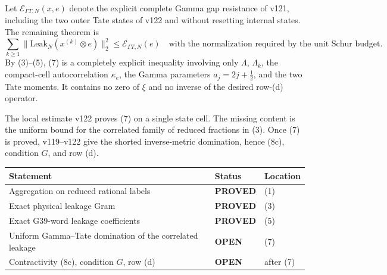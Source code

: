\documentclass[11pt]{article}
\newcommand{\PROVED}{\textcolor{green!40!black}{\textbf{PROVED}}}
\newcommand{\OPEN}{\textcolor{red!70!black}{\textbf{OPEN}}}
\begin{document}
Let $\mathcal E_{\Gamma T,N}(x,e)$ denote the explicit complete Gamma gap
resistance of v121, including the two outer Tate states of v122 and without
resetting internal states.  The remaining theorem is
\begin{equation}
 \boxed{
 \sum_{k\ge1}
 \|\mathrm{Leak}_N(x^{(k)}\otimes e)\|_2^2
 \le \mathcal E_{\Gamma T,N}(e)
 \quad\text{with the normalization required by the unit Schur budget}.}
                                                                    \tag{7}
\end{equation}
By (3)--(5), (7) is a completely explicit inequality involving only
$\Lambda$, $\Lambda_k$, the compact-cell autocorrelation $\kappa_e$, the
Gamma parameters $a_j=2j+\frac12$, and the two Tate moments.  It contains
no zero of $\xi$ and no inverse of the desired row-(d) operator.

The local estimate v122 proves (7) on a single state cell.  The missing
content is the uniform bound for the correlated family of reduced fractions
in (3).  Once (7) is proved, v119--v122 give the shorted inverse-metric
domination, hence (8c), condition $G$, and row (d).

\begin{center}
\begin{tabular}{>{\raggedright\arraybackslash}p{.55\linewidth}
                >{\centering\arraybackslash}p{.15\linewidth}
                >{\raggedright\arraybackslash}p{.20\linewidth}}
\toprule
Statement & Status & Location \\
\midrule
Aggregation on reduced rational labels & \PROVED & (1) \\
Exact physical leakage Gram & \PROVED & (3) \\
Exact G39-word leakage coefficients & \PROVED & (5) \\
Uniform Gamma--Tate domination of the correlated leakage & \OPEN & (7) \\
Contractivity (8c), condition $G$, row (d) & \OPEN & after (7) \\
\bottomrule
\end{tabular}
\end{center}
\end{document}
